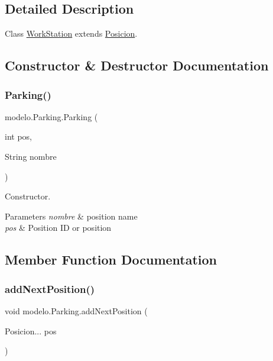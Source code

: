 \subsection{Detailed Description}
Class \mbox{\hyperlink{classmodelo_1_1_work_station}{Work\+Station}} extends \mbox{\hyperlink{classmodelo_1_1_posicion}{Posicion}}. 

\subsection{Constructor \& Destructor Documentation}
\mbox{\label{classmodelo_1_1_parking_a23a70e07f89a4a9f3fab811546775ced}} 
\subsubsection{\texorpdfstring{Parking()}{Parking()}}
{\footnotesize\ttfamily modelo.\+Parking.\+Parking (\begin{DoxyParamCaption}\item[{int}]{pos,  }\item[{String}]{nombre }\end{DoxyParamCaption})}



Constructor. 


\begin{DoxyParams}{Parameters}
{\em nombre} & position name \\
\hline
{\em pos} & Position ID or position \\
\hline
\end{DoxyParams}


\subsection{Member Function Documentation}
\mbox{\label{classmodelo_1_1_parking_ab2b526a6e9e8526767a0173cc3e4d406}} 
\subsubsection{\texorpdfstring{add\+Next\+Position()}{addNextPosition()}}
{\footnotesize\ttfamily void modelo.\+Parking.\+add\+Next\+Position (\begin{DoxyParamCaption}\item[{Posicion...}]{pos }\end{DoxyParamCaption})}



